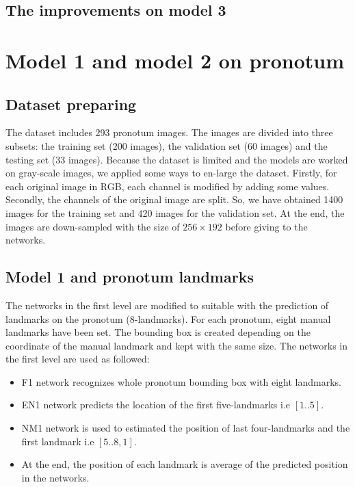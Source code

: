 \documentclass[12pt,a4paper]{article}
\begin{document}
\subsection{The improvements on model 3}

\section{Model 1 and model 2 on pronotum}
\subsection{Dataset preparing}
The dataset includes 293 pronotum images. The images are divided into three subsets: the training set (200 images), the validation set (60 images) and the testing set (33 images). Because the dataset is limited and the models are worked on gray-scale images, we applied some ways to en-large the dataset. Firstly, for each original image in RGB, each channel is modified by adding some values. Secondly, the channels of the original image are split. So, we have obtained 1400 images for the training set and 420 images for the validation set. At the end, the images are down-sampled with the  size of $256 \times 192$ before giving to the networks.

\subsection{Model 1 and pronotum landmarks}
The networks in the first level are modified to suitable with the prediction of landmarks on the pronotum (8-landmarks). For each pronotum, eight manual landmarks have been set. The bounding box is created depending on the coordinate of the manual landmark and kept with the same size. The networks in the first level are used as followed:
\begin{itemize}
	\item F1 network recognizes whole pronotum bounding box with eight landmarks.
	\item EN1 network predicts the location of the first five-landmarks i.e $[1..5]$.
	\item NM1 network is used to estimated the position of last four-landmarks and the first landmark i.e $[5..8,1]$.
	\item At the end, the position of each landmark is average of the predicted position in the networks.
\end{itemize} 
\end{document}
